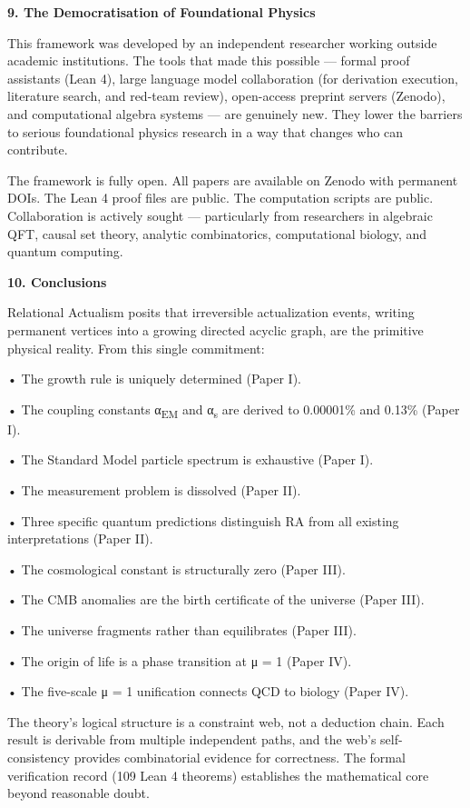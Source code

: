 \documentclass[12pt,a4paper]{article}
\begin{document}
\textbf{9. The Democratisation of Foundational Physics}

This framework was developed by an independent researcher working
outside academic institutions. The tools that made this possible ---
formal proof assistants (Lean 4), large language model collaboration
(for derivation execution, literature search, and red-team review),
open-access preprint servers (Zenodo), and computational algebra systems
--- are genuinely new. They lower the barriers to serious foundational
physics research in a way that changes who can contribute.

The framework is fully open. All papers are available on Zenodo with
permanent DOIs. The Lean 4 proof files are public. The computation
scripts are public. Collaboration is actively sought --- particularly
from researchers in algebraic QFT, causal set theory, analytic
combinatorics, computational biology, and quantum computing.

\textbf{10. Conclusions}

Relational Actualism posits that irreversible actualization events,
writing permanent vertices into a growing directed acyclic graph, are
the primitive physical reality. From this single commitment:

• The growth rule is uniquely determined (Paper I).

• The coupling constants α\textsubscript{EM} and α\textsubscript{s} are
derived to 0.00001\% and 0.13\% (Paper I).

• The Standard Model particle spectrum is exhaustive (Paper I).

• The measurement problem is dissolved (Paper II).

• Three specific quantum predictions distinguish RA from all existing
interpretations (Paper II).

• The cosmological constant is structurally zero (Paper III).

• The CMB anomalies are the birth certificate of the universe (Paper
III).

• The universe fragments rather than equilibrates (Paper III).

• The origin of life is a phase transition at μ = 1 (Paper IV).

• The five-scale μ = 1 unification connects QCD to biology (Paper IV).

The theory's logical structure is a constraint web, not a deduction
chain. Each result is derivable from multiple independent paths, and the
web's self-consistency provides combinatorial evidence for correctness.
The formal verification record (109 Lean 4 theorems) establishes the
mathematical core beyond reasonable doubt.
\end{document}
